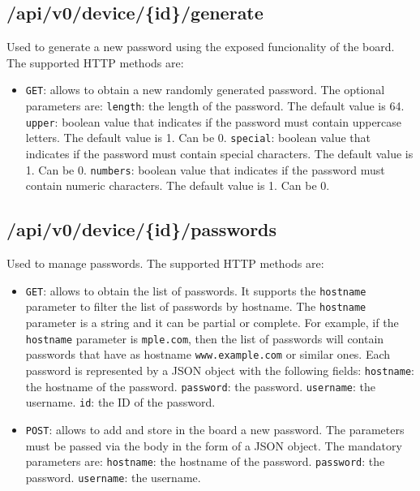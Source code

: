 \subsection{/api/v0/device/\{id\}/generate}
Used to generate a new password using the exposed funcionality of the board. The supported HTTP methods are:

\begin{itemize}
    \item \texttt{GET}: allows to obtain a new randomly generated password. The optional parameters are:
        \subitem \texttt{length}: the length of the password. The default value is 64.
        \subitem \texttt{upper}: boolean value that indicates if the password must contain uppercase letters. The default value is 1. Can be 0.
        \subitem \texttt{special}: boolean value that indicates if the password must contain special characters. The default value is 1. Can be 0.
        \subitem \texttt{numbers}: boolean value that indicates if the password must contain numeric characters. The default value is 1. Can be 0.
\end{itemize}

\subsection{/api/v0/device/\{id\}/passwords}
Used to manage passwords. The supported HTTP methods are:

\begin{itemize}
    \item \texttt{GET}: allows to obtain the list of passwords. It supports the \texttt{hostname} parameter to filter the list of passwords by hostname. The \texttt{hostname} parameter is a string and it can be partial or complete. For example, if the \texttt{hostname} parameter is \texttt{mple.com}, then the list of passwords will contain passwords that have as hostname \texttt{www.example.com} or similar ones. Each password is represented by a JSON object with the following fields:
        \subitem \texttt{hostname}: the hostname of the password.
        \subitem \texttt{password}: the password.
        \subitem \texttt{username}: the username.
        \subitem \texttt{id}: the ID of the password.
    \item \texttt{POST}: allows to add and store in the board a new password. The parameters must be passed via the body in the form of a JSON object. The mandatory parameters are:
        \subitem \texttt{hostname}: the hostname of the password.
        \subitem \texttt{password}: the password.
        \subitem \texttt{username}: the username.
\end{itemize}

